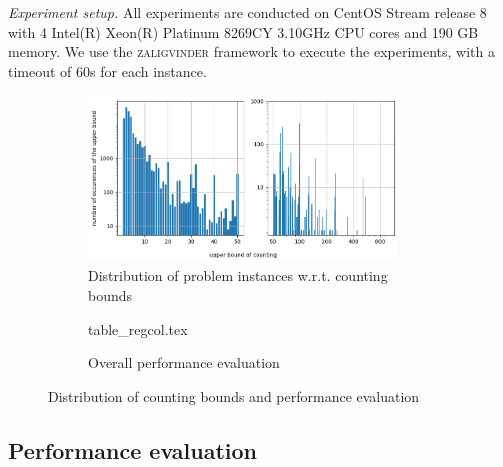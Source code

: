 \medskip
\noindent
\emph{Experiment setup.}
All experiments are conducted on CentOS Stream release 8 with 4 Intel(R) Xeon(R) Platinum 8269CY 3.10GHz CPU cores and 190 GB memory. We use the \textsc{zaligvinder} framework \cite{zaligvinder_2021} to execute the experiments, with a timeout of 60s for each instance.


%
\begin{figure}[ht]
\vspace{-2mm}
  \centering
  \begin{subfigure}[t]{0.49\textwidth}
    \centering\vskip 0pt
    \includegraphics[width=0.9\textwidth]{counting_distribution.png}  
    \caption{Distribution of problem instances w.r.t. counting bounds}  
    \label{fig:count_distri}
  \end{subfigure}
  \hfill
  \begin{subfigure}[t]{0.49\textwidth}
    \centering\vskip 0pt
      {table_regcol.tex}
      \caption{Overall performance evaluation}
    \label{fig:table_overall_eval}
  \end{subfigure}
  \caption{Distribution of counting bounds and performance evaluation}
\vspace{-7mm}
\end{figure}

\subsection{Performance evaluation}\label{subsec:overall_eval}

